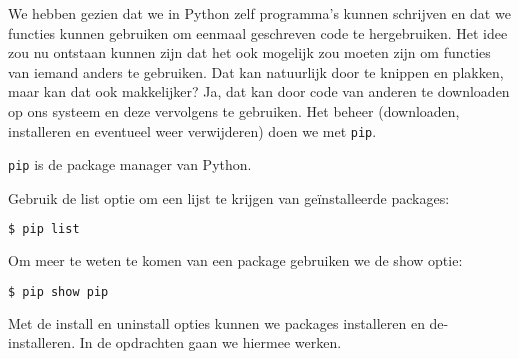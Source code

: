 We hebben gezien dat we in Python zelf programma's kunnen schrijven en dat we functies kunnen gebruiken om eenmaal geschreven code te hergebruiken. Het idee zou nu ontstaan kunnen zijn dat het ook mogelijk zou moeten zijn om functies van iemand anders te gebruiken. Dat kan natuurlijk door te knippen en plakken, maar kan dat ook makkelijker? Ja, dat kan door code van anderen te downloaden op ons systeem en deze vervolgens te gebruiken. Het beheer (downloaden, installeren en eventueel weer verwijderen) doen we met \texttt{pip}.

\texttt{pip} is de package manager van Python.

Gebruik de list optie om een lijst te krijgen van ge\"installeerde packages:
\begin{lstlisting}[language=bash]
$ pip list
\end{lstlisting}

Om meer te weten te komen van een package gebruiken we de show optie:
\begin{lstlisting}[language=bash]
$ pip show pip
\end{lstlisting}

Met de install en uninstall opties kunnen we packages installeren en de-installeren. In de opdrachten gaan we hiermee werken.

